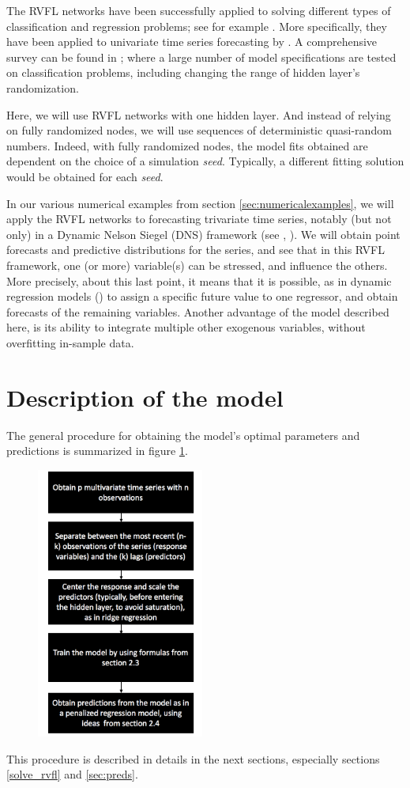 \medskip

The RVFL networks have been successfully applied to solving different types of classification and regression problems; see for example \cite{dehuri2010comprehensive}. More specifically, they have been applied to univariate time series forecasting by \cite{ren2016random}. A comprehensive survey can be found in \cite{zhang2016comprehensive}; where a large number of model specifications are tested on classification problems, including changing the range of hidden layer's randomization.

\medskip

Here, we will use RVFL networks with one hidden layer. And instead of relying on fully randomized nodes, we will use sequences of deterministic quasi-random numbers. Indeed, with fully randomized nodes, the model fits obtained are dependent on the choice of a simulation \textit{seed}. Typically, a different fitting solution would be obtained for each \textit{seed}.

\medskip

In our various numerical examples from section \ref{sec:numericalexamples}, we will apply the RVFL networks to forecasting trivariate time series, notably (but not only) in a Dynamic Nelson Siegel (DNS) framework (see \cite{nelson1987parsimonious}, \cite{diebold2006forecasting}). We will obtain point forecasts and predictive distributions  for the series, and see that in this RVFL framework, one (or more) variable(s) can be stressed, and influence the others. More precisely, about this last point, it means that it is possible, as in dynamic regression models (\cite{pankratz2012forecasting}) to assign a specific future value to one regressor, and obtain forecasts of the remaining variables. Another advantage of the model described here, is its ability to integrate multiple other exogenous variables, without overfitting in-sample data.

\section{Description of the model}

The general procedure for obtaining the model's optimal parameters and predictions is  summarized in figure \ref{fig:flowchart}. 

\begin{figure}[!htb]
\centering
\includegraphics[width=5.5cm]{gfx/chapter-rvfl-mts/flowchart}
\caption{}
\label{fig:flowchart}
\end{figure}


This procedure is described in details in the next sections, especially sections \ref{solve_rvfl} and \ref{sec:preds}. 
